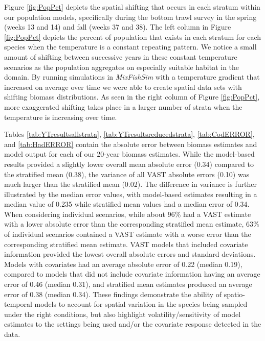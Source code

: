 \documentclass[
  12pt,
]{article}
\begin{document}
Figure \ref{fig:PopPct} depicts the spatial shifting that occurs in each stratum within our population models, specifically during the bottom trawl survey in the spring (weeks 13 and 14) and fall (weeks 37 and 38). The left column in Figure \ref{fig:PopPct} depicts the percent of population that exists in each stratum for each species when the temperature is a constant repeating pattern. We notice a small amount of shifting between successive years in these constant temperature scenarios as the population aggregates on especially suitable habitat in the domain. By running simulations in \emph{MixFishSim} with a temperature gradient that increased on average over time we were able to create spatial data sets with shifting biomass distributions. As seen in the right column of Figure \ref{fig:PopPct}, more exaggerated shifting takes place in a larger number of strata when the temperature is increasing over time.

Tables \ref{tab:YTresultsallstrata}, \ref{tab:YTresultsreducedstrata}, \ref{tab:CodERROR}, and \ref{tab:HadERROR} contain the absolute error between biomass estimates and model output for each of our 20-year biomass estimates. While the model-based results provided a slightly lower overall mean absolute error (0.34) compared to the stratified mean (0.38), the variance of all VAST absolute errors (0.10) was much larger than the stratified mean (0.02). The difference in variance is further illustrated by the median error values, with model-based estimates resulting in a median value of 0.235 while stratified mean values had a median error of 0.34. When considering individual scenarios, while about \(96\%\) had a VAST estimate with a lower absolute error than the corresponding stratified mean estimate, \(63\%\) of individual scenarios contained a VAST estimate with a worse error than the corresponding stratified mean estimate. VAST models that included covariate information provided the lowest overall absolute errors and standard deviations. Models with covariates had an average absolute error of 0.22 (median 0.19), compared to models that did not include covariate information having an average error of 0.46 (median 0.31), and stratified mean estimates produced an average error of 0.38 (median 0.34). These findings demonstrate the ability of spatio-temporal models to account for spatial variation in the species being sampled under the right conditions, but also highlight volatility/sensitivity of model estimates to the settings being used and/or the covariate response detected in the data.
\end{document}

